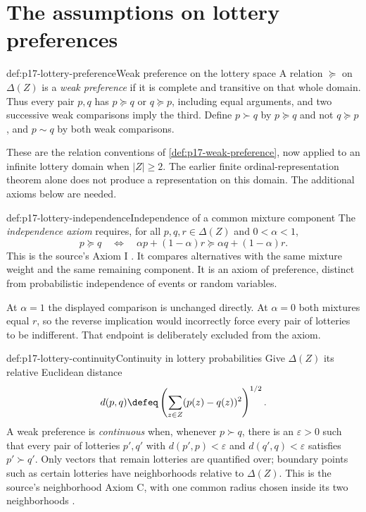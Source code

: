 \section{The assumptions on lottery preferences}
\label{sec:p17-lottery-axioms}

\begin{hbdefinition}{def:p17-lottery-preference}{Weak preference on the lottery space}
A relation \(\succeq\) on \(\Delta(Z)\) is a \emph{weak preference}
if it is complete and transitive on that whole domain. Thus every pair
\(p,q\) has \(p\succeq q\) or \(q\succeq p\), including equal
arguments, and two successive weak comparisons imply the third.
Define \(p\succ q\) by \(p\succeq q\) and not \(q\succeq p\),
and \(p\sim q\) by both weak comparisons.

These are the relation conventions of \cref{def:p17-weak-preference}, now
applied to an infinite lottery domain when \(|Z|\geq2\). The earlier
finite ordinal-representation theorem alone does not produce a
representation on this domain. The additional axioms below are needed.
\end{hbdefinition}

\begin{hbdefinition}{def:p17-lottery-independence}{Independence of a common mixture component}
The \emph{independence axiom} requires, for all \(p,q,r\in\Delta(Z)\)
and \(0<\alpha<1\),
\[
 p\succeq q\quad\Longleftrightarrow\quad
 \alpha p+(1-\alpha)r\succeq\alpha q+(1-\alpha)r.
\]
This is the source's Axiom I \cite[p.~97]{Rubinstein2015LectureNotes}.
It compares alternatives with the same mixture weight and the same
remaining component. It is an axiom of preference, distinct from
probabilistic independence of events or random variables.

At \(\alpha=1\) the displayed comparison is unchanged directly.
At \(\alpha=0\) both mixtures equal \(r\), so the reverse implication
would incorrectly force every pair of lotteries to be indifferent.
That endpoint is deliberately excluded from the axiom.
\end{hbdefinition}

\begin{hbdefinition}{def:p17-lottery-continuity}{Continuity in lottery probabilities}
Give \(\Delta(Z)\) its relative Euclidean distance
\[
 d(p,q)\defeq\left(\sum_{z\in Z}(p(z)-q(z))^2\right)^{1/2}.
\]
A weak preference is \emph{continuous} when, whenever \(p\succ q\),
there is an \(\varepsilon>0\) such that every pair of lotteries
\(p',q'\) with \(d(p',p)<\varepsilon\) and
\(d(q',q)<\varepsilon\) satisfies \(p'\succ q'\).
Only vectors that remain lotteries are quantified over; boundary points
such as certain lotteries have neighborhoods relative to \(\Delta(Z)\).
This is the source's neighborhood Axiom C, with one common radius chosen
inside its two neighborhoods \cite[p.~98]{Rubinstein2015LectureNotes}.
\end{hbdefinition}

